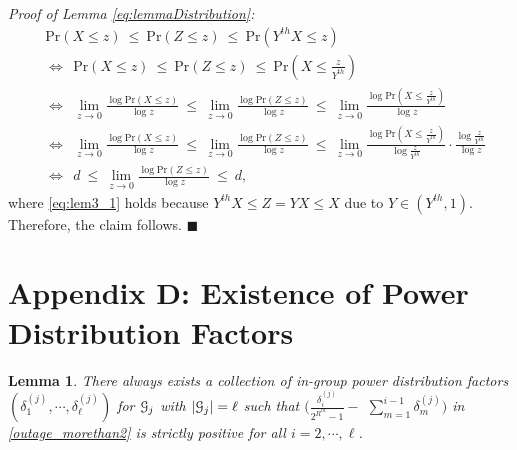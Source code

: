 \documentclass[11pt, draft, onecolumn ]{IEEEtran}
\newtheorem{lemma}{Lemma}
\begin{document}
{\em Proof of Lemma \ref{eq:lemmaDistribution}:}
  \begin{align}
             &  \mathrm{Pr}(   X \leq z ) ~ \leq ~ \mathrm{Pr}(  Z \leq z) ~ \leq ~ \mathrm{Pr}( Y^{th} X \leq z ) \label{eq:lem3_1}\\
             & \Leftrightarrow ~~ \mathrm{Pr}(   X \leq z ) ~ \leq ~ \mathrm{Pr}(  Z \leq z) ~ \leq ~ \mathrm{Pr}( X \leq  \frac{z}{Y^{th}} ) \nonumber \\
             & \Leftrightarrow ~~  \lim_{z \rightarrow 0}  \frac{\log \mathrm{Pr}(   X \leq z )}{\log z} ~ \leq ~ \lim_{z \rightarrow 0} \frac{ \log \mathrm{Pr}(  Z \leq z)}{\log{z}} ~ \leq ~ \lim_{z \rightarrow 0}  \frac{ \log \mathrm{Pr}( X \leq  \frac{z}{Y^{th}} )}{\log z} \nonumber \\
              & \Leftrightarrow ~~  \lim_{z \rightarrow 0}  \frac{ \log \mathrm{Pr}(   X \leq z )}{\log z} ~ \leq ~ \lim_{z \rightarrow 0} \frac{ \log \mathrm{Pr}(  Z \leq z)}{\log{z}} ~ \leq ~ \lim_{z \rightarrow 0}  \frac{\log \mathrm{Pr}( X \leq  \frac{z}{Y^{th}} )}{\log \frac{z}{Y^{th}} } \cdot \frac{\log \frac{z}{Y^{th}}}{\log z} \nonumber\\
              & \Leftrightarrow ~~ d ~ \leq ~  \lim_{z \rightarrow 0} \frac{ \log \mathrm{Pr}(  Z \leq z)}{\log{z}}  ~\leq ~ d, \nonumber
 \end{align}
where  \eqref{eq:lem3_1} holds because $Y^{th}X \le Z=YX \le X$ due to $Y\in (Y^{th},1)$.       Therefore, the claim follows. \hfill{$\blacksquare$}



\section*{Appendix D: Existence of Power Distribution Factors}


\begin{lemma}  \label{lem:ExistDeltasForTheo1}
There always exists a collection of in-group power distribution factors $(\delta_1^{(j)},\cdots,\delta_\ell^{(j)})$  for ${\cal G}_j$ with $|{\cal G}_j|=\ell$ such that $( \frac{\delta_{i}^{(j)}}{2^{R^{th}}-1} -$ $ \sum_{m=1}^{i-1} \delta_{m}^{(j)} )$ in  \eqref{outage_morethan2} is strictly positive for all $i=2,\cdots, \ell$.
\end{lemma}
\end{document}
